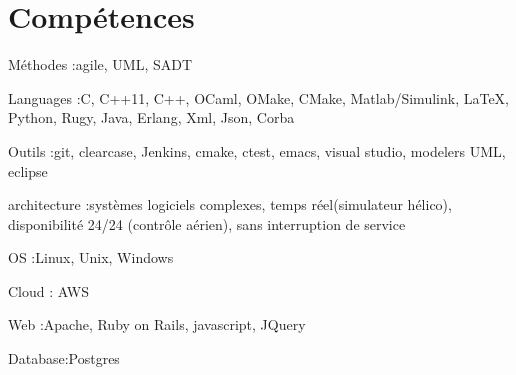 \section{Compétences}

\begin{itemize}

\myitem
{Méthodes :}{agile, UML, SADT}

\myitem
{Languages :}{C, C++11, C++, OCaml, OMake, CMake, Matlab/Simulink, LaTeX, Python, Rugy, Java, Erlang, Xml, Json, Corba}

\myitem
{Outils :}{git, clearcase, Jenkins, cmake, ctest, emacs, visual studio, modelers UML, eclipse}

\myitem
{architecture :}{systèmes logiciels complexes, temps réel(simulateur hélico), disponibilité 24/24 (contrôle aérien), sans interruption de service}

\myitem
{OS :}{Linux, Unix, Windows}

\myitem
{Cloud} : {AWS}

\myitem 
{Web :}{Apache, Ruby on Rails, javascript, JQuery}

\myitem 
{Database:}{Postgres}

\end{itemize}
